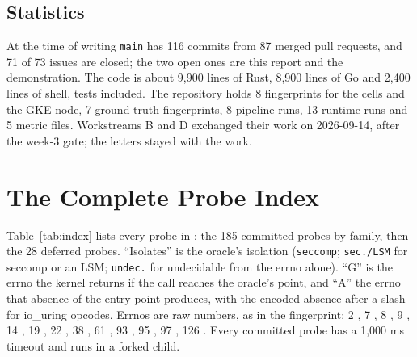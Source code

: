 \section{Statistics}

At the time of writing \texttt{main} has 116 commits from 87 merged pull requests, and 71 of 73 issues are closed; the two open ones are this report and the demonstration. The code is about 9,900 lines of Rust, 8,900 lines of Go and 2,400 lines of shell, tests included. The repository holds 8 fingerprints for the cells and the GKE node, 7 ground-truth fingerprints, 8 pipeline runs, 13 runtime runs and 5 metric files. Workstreams B and D exchanged their work on 2026-09-14, after the week-3 gate; the letters stayed with the work.

\chapter{The Complete Probe Index}
\label{app:index}

Table~\ref{tab:index} lists every probe in : the 185 committed probes by family, then the 28 deferred probes. ``Isolates'' is the oracle's isolation (\texttt{seccomp}; \texttt{sec./LSM} for seccomp or an LSM; \texttt{undec.} for undecidable from the errno alone). ``G'' is the errno the kernel returns if the call reaches the oracle's point, and ``A'' the errno that absence of the entry point produces, with the encoded absence after a slash for io\_uring opcodes. Errnos are raw numbers, as in the fingerprint: 2 , 7 , 8 , 9 , 14 , 19 , 22 , 38 , 61 , 93 , 95 , 97 , 126 . Every committed probe has a 1,000 ms timeout and runs in a forked child.


